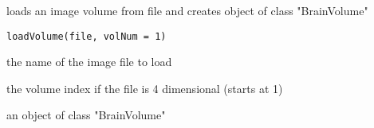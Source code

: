 \begin{Description}\relax
loads an image volume from file and creates object of class "BrainVolume"
\end{Description}
\begin{Usage}
\begin{verbatim}
loadVolume(file, volNum = 1)
\end{verbatim}
\end{Usage}
\begin{Arguments}
\begin{ldescription}
\item[\code{file}] the name of the image file to load 
\item[\code{volNum}] the volume index if the file is 4 dimensional (starts at 1) 
\end{ldescription}
\end{Arguments}
\begin{Value}
an object of class "BrainVolume"
\end{Value}


